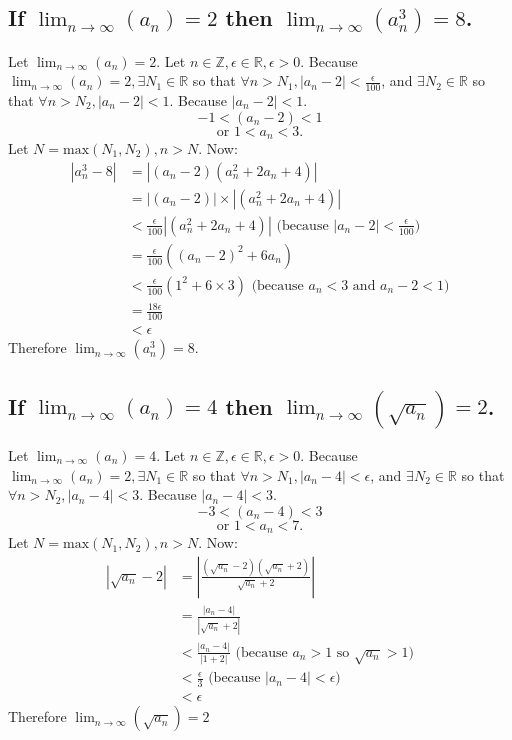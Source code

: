 \documentclass[10pt, letterpaper, titlepage]{article}
\newcommand{\0}{\varnothing}
\newcommand{\Z}{\mathbb{Z}}
\newcommand{\R}{\mathbb{R}}
\newcommand\abs[1]{\left|#1\right|}
\newcommand{\lntinf}{\lim_{n \to \infty}}
\newcommand{\1}{\{ 1 \}}
\newcommand{\2}{\{ (1,1) \}}
\newcommand{\e}{\epsilon}
\newcommand{\an}{a_n}
\begin{document}
        \subsection{If $\lntinf (\an) = 2$ then $\lntinf (a_n^3 ) = 8$.}
            Let $\lntinf (\an) = 2$. Let $n \in \Z, \e \in \R, \e > 0$.
            Because $\lntinf (\an) = 2, \exists N_1 \in \R$ so that $\forall n > N_1, \abs{\an - 2} < \frac{\e}{100}$,
            and $\exists N_2 \in \R$ so that $\forall n > N_2, \abs{\an - 2} < 1$.
            Because $\abs{\an - 2} < 1$.
            $$-1 < (\an - 2) < 1$$
            $$\text{or } 1 < \an < 3.$$
            Let $N = \text{max}(N_1, N_2), n > N$.
            Now:
            \begin{align*}
                \abs{\an ^ 3 - 8} &= \abs{(\an -2)(\an^2 + 2\an + 4)}\\
                &=  \abs{(\an -2)}\times \abs{(\an^2 + 2\an + 4)}\\
                &< \frac{\e}{100} \abs{(\an^2 + 2\an + 4)} \text{ (because $\abs{\an -2} < \frac{\e}{100}$)}\\
                &= \frac{\e}{100} ((\an - 2)^2 +6\an)\\
                &< \frac{\e}{100} (1^2 +6\times3) \text{ (because $\an < 3$ and $\an - 2 < 1$)}\\
                &= \frac{18\e}{100}\\
                &< \e
            \end{align*}
            Therefore $\lntinf (\an^3) = 8$.

        \subsection{If $\lntinf (\an) = 4$ then $\lntinf (\sqrt{\an}) = 2$.}
            Let $\lntinf (\an) = 4$. Let $n \in \Z, \e \in \R, \e > 0$.
            Because $\lntinf (\an) = 2, \exists N_1 \in \R$ so that $\forall n > N_1, \abs{\an - 4} < \e$,
            and $\exists N_2 \in \R$ so that $\forall n > N_2, \abs{\an - 4} < 3$.
            Because $\abs{\an - 4} < 3$.
            $$-3 < (\an - 4) < 3$$
            $$\text{or } 1 < \an < 7.$$
            Let $N = \text{max}(N_1, N_2), n > N$.
            Now:
            \begin{align*}
                \abs{\sqrt{\an} -2} &= \abs{\frac{(\sqrt{\an} -2)(\sqrt{\an} +2)}{\sqrt{\an} +2}}\\
                &=\frac{\abs{\an - 4}}{\abs{\sqrt{\an}+2}}\\
                &< \frac{\abs{\an - 4}}{\abs{1+2}} \text{ (because $\an > 1$ so $\sqrt{\an} > 1$)}\\
                &< \frac{\e}{3} \text{ (because $\abs{\an - 4} < \e$)}\\
                &< \e
            \end{align*}
            Therefore $\lntinf (\sqrt{\an}) = 2$
\end{document}
